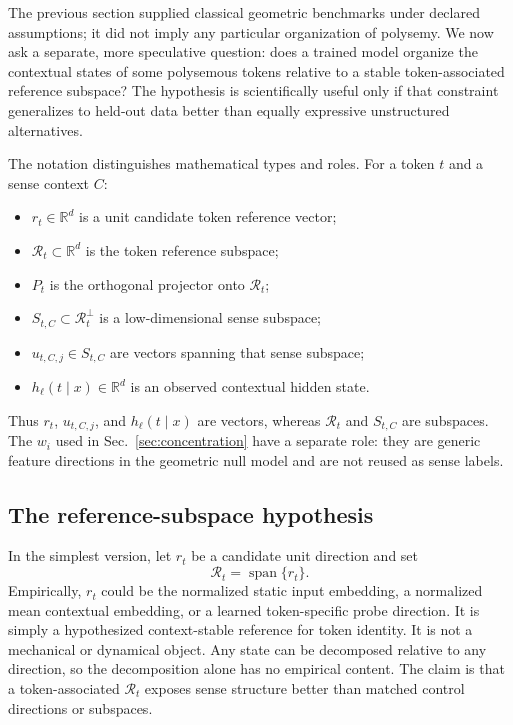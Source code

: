\documentclass[
  aps,
  reprint,
  superscriptaddress,
  floatfix,
  nofootinbib,
  longbibliography
]{revtex4-2}
\newcommand{\R}{\mathbb{R}}
\DeclareMathOperator{\spanop}{span}
\begin{document}
The previous section supplied classical geometric benchmarks under declared
assumptions; it did not imply any particular organization of polysemy.  We now
ask a separate, more speculative question: does a trained model organize the
contextual states of some polysemous tokens relative to a stable
token-associated reference subspace?  The hypothesis is scientifically useful
only if that constraint generalizes to held-out data better than equally
expressive unstructured alternatives.

The notation distinguishes mathematical types and roles. For a token $t$
and a sense context $C$:
%
\begin{itemize}
\item $r_t\in\R^d$ is a unit candidate token reference vector;
\item $\mathcal R_t\subset\R^d$ is the token reference subspace;
\item $P_t$ is the orthogonal projector onto $\mathcal R_t$;
\item $S_{t,C}\subset\mathcal R_t^\perp$ is a low-dimensional sense
subspace;
\item $u_{t,C,j}\in S_{t,C}$ are vectors spanning that sense subspace;
\item $h_\ell(t\mid x)\in\R^d$ is an observed contextual hidden state.
\end{itemize}
%
Thus $r_t$, $u_{t,C,j}$, and $h_\ell(t\mid x)$ are vectors, whereas
$\mathcal R_t$ and $S_{t,C}$ are subspaces. The $w_i$ used in
Sec.~\ref{sec:concentration} have a separate role: they are generic feature
directions in the geometric null model and are not reused as sense labels.

\subsection{The reference-subspace hypothesis}
\label{sec:reference-hypothesis}

In the simplest version, let $r_t$ be a candidate unit direction and set
%
\begin{equation}
\label{eq:reference-direction}
\mathcal R_t=\spanop\{r_t\}.
\end{equation}
%
Empirically, $r_t$ could be the normalized static input embedding, a
normalized mean contextual embedding, or a learned token-specific probe
direction. It is simply a hypothesized context-stable reference for token
identity. It is not a mechanical or dynamical object.
Any state can be decomposed relative to any direction, so the decomposition
alone has no empirical content. The claim is that a token-associated
$\mathcal R_t$ exposes sense structure better than matched control
directions or subspaces.
\end{document}

